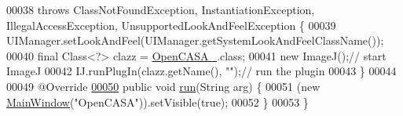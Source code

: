 \begin{DoxyCode}
00038       \textcolor{keywordflow}{throws} ClassNotFoundException, InstantiationException, IllegalAccessException, 
      UnsupportedLookAndFeelException \{
00039     UIManager.setLookAndFeel(UIManager.getSystemLookAndFeelClassName());
00040     \textcolor{keyword}{final} Class<?> clazz = \hyperlink{class_open_c_a_s_a__}{OpenCASA\_}.class;
00041     \textcolor{keyword}{new} ImageJ();\textcolor{comment}{// start ImageJ}
00042     IJ.runPlugIn(clazz.getName(), \textcolor{stringliteral}{""});\textcolor{comment}{// run the plugin}
00043   \}
00044 
00049   @Override
\hypertarget{_open_c_a_s_a___8java_source_l00050}{}\hyperlink{class_open_c_a_s_a___a4d9c6a01d97384c0df54710b80fc88fc}{00050}   \textcolor{keyword}{public} \textcolor{keywordtype}{void} \hyperlink{class_open_c_a_s_a___a4d9c6a01d97384c0df54710b80fc88fc}{run}(String arg) \{
00051     (\textcolor{keyword}{new} \hyperlink{classgui_1_1_main_window}{MainWindow}(\textcolor{stringliteral}{"OpenCASA"})).setVisible(\textcolor{keyword}{true});
00052   \}
00053 \}
\end{DoxyCode}
